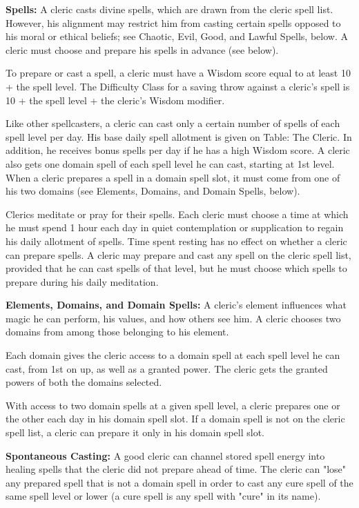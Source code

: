 \documentclass[10pt,a4paper,twocolumn]{d20}
\begin{document}
{\textbf{Spells:} A cleric casts divine spells, which are drawn from the cleric spell list. However, his alignment may restrict him from casting certain spells opposed to his moral or ethical beliefs; see Chaotic, Evil, Good, and Lawful Spells, below. A cleric must choose and prepare his spells in advance (see below).

To prepare or cast a spell, a cleric must have a Wisdom score equal to at least 10 + the spell level. The Difficulty Class for a saving throw against a cleric’s spell is 10 + the spell level + the cleric’s Wisdom modifier.

Like other spellcasters, a cleric can cast only a certain number of spells of each spell level per day. His base daily spell allotment is given on Table: The Cleric. In addition, he receives bonus spells per day if he has a high Wisdom score. A cleric also gets one domain spell of each spell level he can cast, starting at 1st level. When a cleric prepares a spell in a domain spell slot, it must come from one of his two domains (see Elements, Domains, and Domain Spells, below).

Clerics meditate or pray for their spells. Each cleric must choose a time at which he must spend 1 hour each day in quiet contemplation or supplication to regain his daily allotment of spells. Time spent resting has no effect on whether a cleric can prepare spells. A cleric may prepare and cast any spell on the cleric spell list, provided that he can cast spells of that level, but he must choose which spells to prepare during his daily meditation.

\textbf{Elements, Domains, and Domain Spells:} A cleric’s element influences what magic he can perform, his values, and how others see him. A cleric chooses two domains from among those belonging to his element.

Each domain gives the cleric access to a domain spell at each spell level he can cast, from 1st on up, as well as a granted power. The cleric gets the granted powers of both the domains selected.

With access to two domain spells at a given spell level, a cleric prepares one or the other each day in his domain spell slot. If a domain spell is not on the cleric spell list, a cleric can prepare it only in his domain spell slot.

\textbf{Spontaneous Casting:} A good cleric can channel stored spell energy into healing spells that the cleric did not prepare ahead of time. The cleric can "lose" any prepared spell that is not a domain spell in order to cast any cure spell of the same spell level or lower (a cure spell is any spell with "cure" in its name).

}
\end{document}
